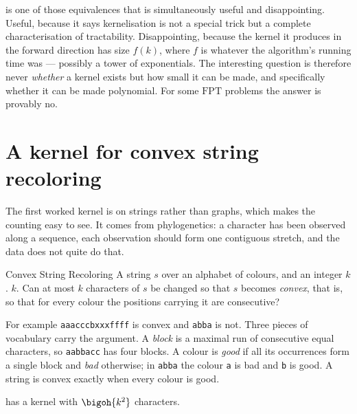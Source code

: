 \begin{intuition}
 is one of those equivalences that is simultaneously
useful and disappointing. Useful, because it says kernelisation is not a
special trick but a complete characterisation of tractability. Disappointing,
because the kernel it produces in the forward direction has size $f(k)$, where
$f$ is whatever the algorithm's running time was --- possibly a tower of
exponentials. The interesting question is therefore never \emph{whether} a
kernel exists but how small it can be made, and specifically whether it can be
made polynomial. For some $\mathrm{FPT}$ problems the answer is provably no.
\end{intuition}

\section{A kernel for convex string recoloring}
\label{sec:fpt-convex-kernel}

The first worked kernel is on strings rather than graphs, which makes the
counting easy to see. It comes from phylogenetics: a character has been observed
along a sequence, each observation should form one contiguous stretch, and the
data does not quite do that.

\begin{probdef}{Convex String Recoloring}
  \instance A string $s$ over an alphabet of colours, and an integer $k$.
  \parameter $k$.
  \question Can at most $k$ characters of $s$ be changed so that $s$ becomes
  \emph{convex}, that is, so that for every colour the positions carrying it are
  consecutive?
\end{probdef}

For example \texttt{aaacccbxxxffff} is convex and \texttt{abba} is not. Three
pieces of vocabulary carry the argument. A \emph{block} is a maximal run of
consecutive equal characters, so \texttt{aabbacc} has four blocks. A colour is
\emph{good} if all its occurrences form a single block and \emph{bad}
otherwise; in \texttt{abba} the colour \texttt{a} is bad and \texttt{b} is good.
A string is convex exactly when every colour is good.

\begin{theorem}\label{thm:convex-kernel}
 has a kernel with $\bigoh{k^2}$ characters.
\end{theorem}

